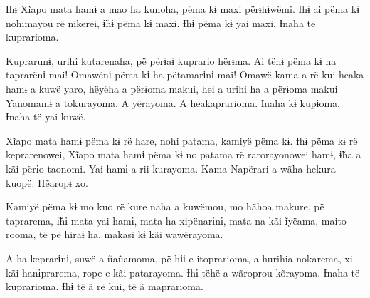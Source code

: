 Ɨhɨ Xĩapo mata hamɨ a mao ha kunoha, pëma kɨ maxi përɨhɨwëmi. Ɨhɨ ai
pëma kɨ nohimayou rë nikerei, ɨ̃hɨ pëma kɨ maxi. Ɨhɨ pëma kɨ yai maxi.
Ɨnaha të kuprarioma. 

Kuprarunɨ, urihi kutarenaha, pë përɨaɨ kuprario hërɨma. Ai tënɨ pëma kɨ
ha taprarënɨ mai! Omawënɨ pëma kɨ ha pëtamarɨnɨ mai! Omawë kama a rë kui
heaka hamɨ a kuwë yaro, hëyëha a përɨoma makui, hei a urihi ha a përɨoma
makui Yanomamɨ a tokurayoma. A yërayoma. A heakaprarioma. Ɨnaha kɨ
kupɨoma. Ɨnaha të yai kuwë. 

Xĩapo mata hamɨ pëma kɨ rë hare, nohi patama, kamiyë pëma kɨ. Ɨhɨ pëma
kɨ rë keprarenowei, Xĩapo mata hamɨ pëma kɨ no patama rë rarorayonowei
hamɨ, ɨ̃ha a kãi përɨo taonomi. Yai hamɨ a rii kurayoma. Kama Napërari a
wãha hekura kuopë. Hẽaropɨ xo. 

Kamiyë pëma kɨ mo kuo rë kure naha a kuwëmou, mo hãhoa makure, pë
taprarema, ɨ̃hɨ mata yai hamɨ, mata ha xipënarɨnɨ, mata na kãi ĩyëama,
maito rooma, të pë hiraɨ ha, makasi kɨ kãi wawërayoma. 

A ha keprarɨnɨ, suwë a ũaũamoma, pë hɨɨ e itoprarioma, a hurihia
nokarema, xi kãi hanɨprarema, rope e kãi patarayoma. Ɨhɨ tëhë a wãroprou
kõrayoma. Ɨnaha të kuprarioma. Ɨhɨ të ã rë kui, të ã maprarioma. 

\begin{center} \end{center}

